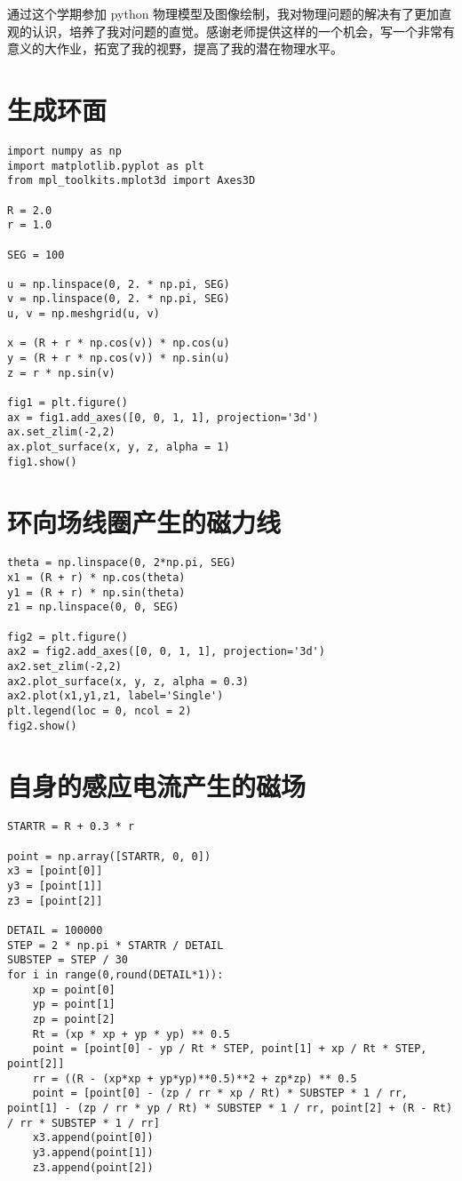 \documentclass[a4paper,12pt]{article}
\begin{document}
\begin{CJK}{UTF8}{gbsn}
通过这个学期参加 python 物理模型及图像绘制，我对物理问题的解决有了更加直观的认识，培养了我对问题的直觉。感谢老师提供这样的一个机会，写一个非常有意义的大作业，拓宽了我的视野，提高了我的潜在物理水平。



\appendix
\section{生成环面}\label{ringcodes}
\begin{lstlisting}
import numpy as np
import matplotlib.pyplot as plt
from mpl_toolkits.mplot3d import Axes3D

R = 2.0 
r = 1.0  

SEG = 100

u = np.linspace(0, 2. * np.pi, SEG)
v = np.linspace(0, 2. * np.pi, SEG)
u, v = np.meshgrid(u, v)

x = (R + r * np.cos(v)) * np.cos(u)
y = (R + r * np.cos(v)) * np.sin(u)
z = r * np.sin(v)

fig1 = plt.figure()
ax = fig1.add_axes([0, 0, 1, 1], projection='3d')
ax.set_zlim(-2,2)
ax.plot_surface(x, y, z, alpha = 1)
fig1.show()
\end{lstlisting}

\section{环向场线圈产生的磁力线}\label{Single}
\begin{lstlisting}
theta = np.linspace(0, 2*np.pi, SEG)
x1 = (R + r) * np.cos(theta)
y1 = (R + r) * np.sin(theta)
z1 = np.linspace(0, 0, SEG)

fig2 = plt.figure()
ax2 = fig2.add_axes([0, 0, 1, 1], projection='3d')
ax2.set_zlim(-2,2)
ax2.plot_surface(x, y, z, alpha = 0.3)
ax2.plot(x1,y1,z1, label='Single')
plt.legend(loc = 0, ncol = 2)
fig2.show()
\end{lstlisting}

\section{自身的感应电流产生的磁场}\label{self}
\begin{lstlisting}
STARTR = R + 0.3 * r

point = np.array([STARTR, 0, 0])
x3 = [point[0]]
y3 = [point[1]]
z3 = [point[2]]

DETAIL = 100000
STEP = 2 * np.pi * STARTR / DETAIL
SUBSTEP = STEP / 30
for i in range(0,round(DETAIL*1)):
    xp = point[0]
    yp = point[1]
    zp = point[2]
    Rt = (xp * xp + yp * yp) ** 0.5
    point = [point[0] - yp / Rt * STEP, point[1] + xp / Rt * STEP, point[2]]
    rr = ((R - (xp*xp + yp*yp)**0.5)**2 + zp*zp) ** 0.5
    point = [point[0] - (zp / rr * xp / Rt) * SUBSTEP * 1 / rr, point[1] - (zp / rr * yp / Rt) * SUBSTEP * 1 / rr, point[2] + (R - Rt) / rr * SUBSTEP * 1 / rr]
    x3.append(point[0])
    y3.append(point[1])
    z3.append(point[2])


\end{lstlisting}
\end{CJK}
\end{document}

